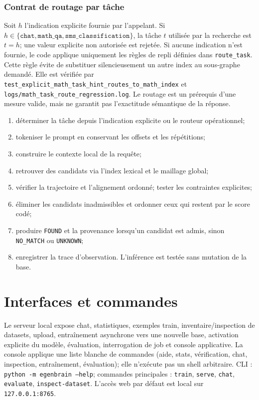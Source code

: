 \documentclass[11pt,a4paper,openany]{book}
\begin{document}
\subsection{Contrat de routage par tâche}
Soit $h$ l'indication explicite fournie par l'appelant. Si $h\in\{\texttt{chat},\texttt{math\_qa},\texttt{sms\_classification}\}$, la tâche $t$ utilisée par la recherche est $t=h$; une valeur explicite non autorisée est rejetée. Si aucune indication n'est fournie, le code applique uniquement les règles de repli définies dans \texttt{route\_task}. Cette règle évite de substituer silencieusement un autre index au sous-graphe demandé. Elle est vérifiée par \texttt{test\_explicit\_math\_task\_hint\_routes\_to\_math\_index} et \texttt{logs/math\_task\_route\_regression.log}. Le routage est un prérequis d'une mesure valide, mais ne garantit pas l'exactitude sémantique de la réponse.

\begin{enumerate}
\item déterminer la tâche depuis l'indication explicite ou le routeur opérationnel;
\item tokeniser le prompt en conservant les offsets et les répétitions;
\item construire le contexte local de la requête;
\item retrouver des candidats via l'index lexical et le maillage global;
\item vérifier la trajectoire et l'alignement ordonné; tester les contraintes explicites;
\item éliminer les candidats inadmissibles et ordonner ceux qui restent par le score codé;
\item produire \texttt{FOUND} et la provenance lorsqu'un candidat est admis, sinon \texttt{NO\_MATCH} ou \texttt{UNKNOWN};
\item enregistrer la trace d'observation. L'inférence est testée sans mutation de la base.
\end{enumerate}

\chapter{Interfaces et commandes}
Le serveur local expose chat, statistiques, exemples train, inventaire/inspection de datasets, upload, entraînement asynchrone vers une nouvelle base, activation explicite du modèle, évaluation, interrogation de job et console applicative. La console applique une liste blanche de commandes (aide, stats, vérification, chat, inspection, entraînement, évaluation); elle n'exécute pas un shell arbitraire. CLI : \texttt{python -m egenbrain --help}; commandes principales : \texttt{train}, \texttt{serve}, \texttt{chat}, \texttt{evaluate}, \texttt{inspect-dataset}. L'accès web par défaut est local sur \texttt{127.0.0.1:8765}.
\end{document}
